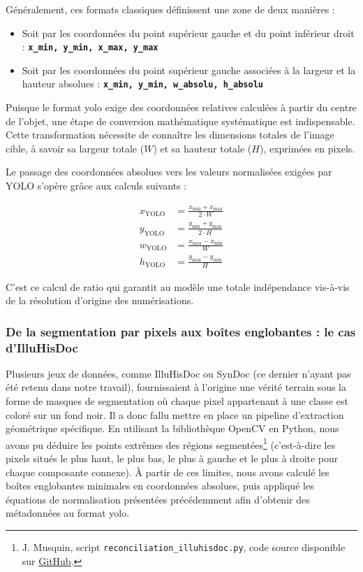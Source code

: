 Généralement, ces formats classiques définissent une zone de deux manières :
\begin{itemize}
    \item Soit par les coordonnées du point supérieur gauche et du point inférieur droit : \texttt{\textbf{x\_min, y\_min, x\_max, y\_max}}
    
    \item Soit par les coordonnées du point supérieur gauche associées à la largeur et la hauteur absolues : \texttt{\textbf{x\_min, y\_min, w\_absolu, h\_absolu}}
\end{itemize}

Puisque le format \gls{yolo} exige des coordonnées relatives calculées à partir du centre de l'objet, une étape de conversion mathématique systématique est indispensable. Cette transformation nécessite de connaître les dimensions totales de l'image cible, à savoir sa largeur totale ($W$) et sa hauteur totale ($H$), exprimées en pixels.

Le passage des coordonnées absolues vers les valeurs normalisées exigées par YOLO s'opère grâce aux calculs suivants :

\begin{align*}
	x_{\text{YOLO}} &= \frac{x_{\text{min}} + x_{\text{max}}}{2 \cdot W} \\[0.5em]
	y_{\text{YOLO}} &= \frac{y_{\text{min}} + y_{\text{max}}}{2 \cdot H} \\[0.5em]
	w_{\text{YOLO}} &= \frac{x_{\text{max}} - x_{\text{min}}}{W} \\[0.5em]
	h_{\text{YOLO}} &= \frac{y_{\text{max}} - y_{\text{min}}}{H}
\end{align*}

C'est ce calcul de ratio qui garantit au modèle une totale indépendance vis-à-vis de la résolution d'origine des numérisations.

\subsubsection{De la segmentation par pixels aux boîtes englobantes : le cas d'IlluHisDoc}

Plusieurs jeux de données, comme IlluHisDoc ou SynDoc (ce dernier n'ayant pas été retenu dans notre travail), fournissaient à l'origine une vérité terrain sous la forme de masques de segmentation où chaque pixel appartenant à une classe est coloré sur un fond noir. Il a donc fallu mettre en place un pipeline d'extraction géométrique spécifique. En utilisant la bibliothèque OpenCV en Python, nous avons pu déduire les points extrêmes des régions segmentées\footnote{J. Musquin, script \texttt{reconciliation\_illuhisdoc.py}, code source disponible sur \href{https://github.com/Anarchiviste/GenHisDoc_Lab/blob/main/01_code/reconciliation_illuhisdoc.py}{GitHub}.} (c'est-à-dire les pixels situés le plus haut, le plus bas, le plus à gauche et le plus à droite pour chaque composante connexe). À partir de ces limites, nous avons calculé les boîtes englobantes minimales en coordonnées absolues, puis appliqué les équations de normalisation présentées précédemment afin d'obtenir des métadonnées au format \gls{yolo}.

